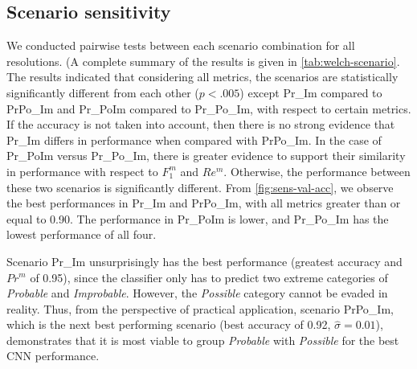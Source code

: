 \documentclass[NewProceedindgs, NoLineNumbers, SectionNumbers, letterpaper, SingleSpace, InsideFigs]{ascelike-new}
\begin{document}

\subsection{Scenario sensitivity}
We conducted pairwise tests between each scenario combination for all resolutions. (A complete summary of the results is given in \autoref{tab:welch-scenario}.
The results indicated that considering all metrics, the scenarios are statistically significantly different from each other ($p < .005$) except Pr\_Im compared to PrPo\_Im and Pr\_PoIm compared to Pr\_Po\_Im, with respect to certain metrics.
If the accuracy is not taken into account, then there is no strong evidence that Pr\_Im differs in performance when compared with PrPo\_Im.
In the case of Pr\_PoIm versus Pr\_Po\_Im, there is greater evidence to support their similarity in performance 
with respect to  $F_{1}^{m}$ and $Re^{m}$. %
Otherwise, the performance between these two scenarios is significantly different.
From \autoref{fig:sens-val-acc}, we observe the best performances in Pr\_Im and PrPo\_Im, with all metrics greater than or equal to 0.90.
The performance in Pr\_PoIm is lower, and Pr\_Po\_Im has the lowest performance of all four.


Scenario Pr\_Im unsurprisingly has the best performance (greatest accuracy and $Pr^{m}$ of 0.95), since the
classifier only has to predict two extreme categories of \textit{Probable} and \textit{Improbable}.  However, the
\textit{Possible} category cannot be evaded in reality.  Thus, from the perspective of practical application, scenario
PrPo\_Im, which is the next best performing scenario (best accuracy of 0.92, $\hat\sigma=0.01$), demonstrates that it is
most viable to group \textit{Probable} with \textit{Possible} for the best CNN performance.
\end{document}
